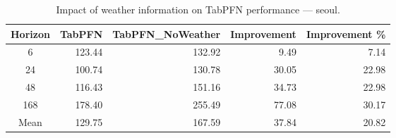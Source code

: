\begin{table}
\centering
\caption{Impact of weather information on TabPFN performance — seoul.}
\label{tab:tabpfn_weather_seoul}
\begin{tabular}{crrrr}
\toprule
Horizon & TabPFN & TabPFN\_NoWeather & Improvement & Improvement \% \\
\midrule
6 & 123.44 & 132.92 & 9.49 & 7.14 \\
24 & 100.74 & 130.78 & 30.05 & 22.98 \\
48 & 116.43 & 151.16 & 34.73 & 22.98 \\
168 & 178.40 & 255.49 & 77.08 & 30.17 \\
\midrule
Mean & 129.75 & 167.59 & 37.84 & 20.82 \\
\bottomrule
\end{tabular}
\end{table}
